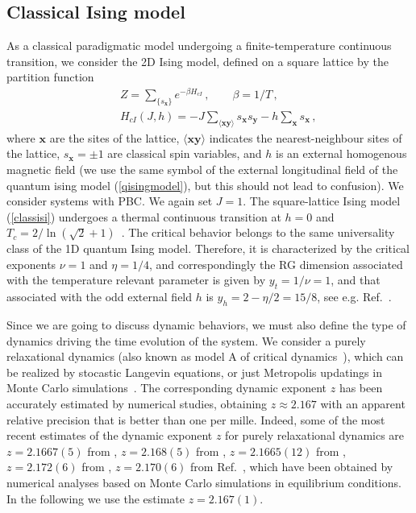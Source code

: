 \subsection{Classical Ising model}
\label{classmod}

As a classical paradigmatic model undergoing a finite-temperature
continuous transition, we consider the 2D Ising model,
defined on a square lattice by the partition function
\begin{eqnarray}
  &&Z = \sum_{\{s_{\bm x}\}} e^{-\beta H_{cI}}\,,\qquad
  \beta=1/T\,, \label{partfunc}\\
  &&H_{cI}(J,h) = - J \sum_{\langle
    {\bm x} {\bm y} \rangle} s_{\bm x} s_{\bm y} - h
  \sum_{\bm x}
  s_{\bm x}\,,
\label{classisi}  
\end{eqnarray}
where ${\bm x}$ are the sites of the lattice, ${\langle {\bm x} {\bm
    y} \rangle}$ indicates the nearest-neighbour sites of the lattice,
$s_{\bm x}=\pm 1$ are classical spin variables, and $h$ is an external
homogenous magnetic field (we use the same symbol of the external
longitudinal field of the quantum ising model (\ref{qisingmodel}), but
this should not lead to confusion). We consider systems with PBC.  We
again set $J=1$.  The square-lattice Ising model (\ref{classisi})
undergoes a thermal continuous transition at $h=0$ and
$T_c=2/\ln(\sqrt{2}+1)$~\cite{Onsager-44}.  The critical behavior
belongs to the same universality class of the 1D quantum Ising
model. Therefore, it is characterized by the critical exponents
$\nu=1$ and $\eta=1/4$, and correspondingly the RG dimension
associated with the temperature relevant parameter is given by
$y_t=1/\nu=1$, and that associated with the odd external field $h$ is
$y_h = 2-\eta/2=15/8$, see e.g. Ref.~\cite{PV2002}.

Since we are going to discuss dynamic behaviors, we must also define
the type of dynamics driving the time evolution of the system.  We
consider a purely relaxational dynamics (also known as model A of
critical dynamics~\cite{HH-77,Ma-book}), which can be realized by stocastic
Langevin equations, or just Metropolis updatings in Monte Carlo
simulations~\cite{Metropolis:1953am}.  The corresponding dynamic
exponent $z$ has been accurately estimated by numerical studies,
obtaining $z\approx 2.167$ with an apparent relative precision that is
better than one per mille. Indeed, some of the most recent estimates
of the dynamic exponent $z$ for purely relaxational dynamics are
$z=2.1667(5)$ from \cite{NB-00}, $z=2.168(5)$ from \cite{WH-97},
$z=2.1665(12)$ from \cite{NB-96}, $z=2.172(6)$ from \cite{G-95},
$z=2.170(6)$ from Ref.~\cite{CV-11}, which have been obtained by
numerical analyses based on Monte Carlo simulations in equilibrium
conditions. In the following we use the estimate $z=2.167(1)$.

